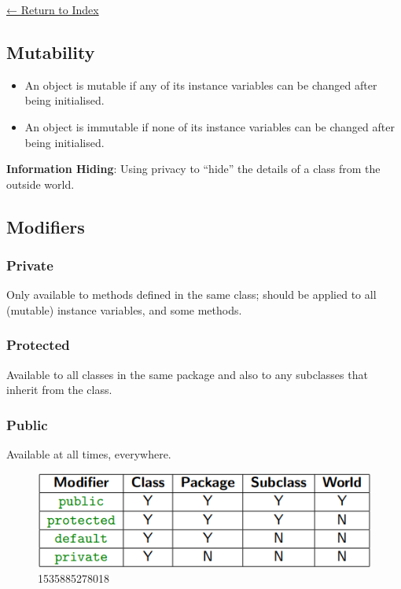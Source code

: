 \documentclass[]{article}
\providecommand{\tightlist}{%
  \setlength{\itemsep}{0pt}\setlength{\parskip}{0pt}}
\begin{document}
\protect\hyperlink{table-of-contents}{← Return to Index}

\hypertarget{mutability}{%
\subsection{Mutability}\label{mutability}}

\begin{itemize}
\tightlist
\item
  An object is mutable if any of its instance variables can be changed
  after being initialised.
\item
  An object is immutable if none of its instance variables can be
  changed after being initialised.
\end{itemize}

\textbf{Information Hiding}: Using privacy to ``hide'' the details of a
class from the outside world.

\hypertarget{modifiers}{%
\subsection{Modifiers}\label{modifiers}}

\hypertarget{private}{%
\subsubsection{Private}\label{private}}

Only available to methods defined in the same class; should be applied
to all (mutable) instance variables, and some methods.

\hypertarget{protected}{%
\subsubsection{Protected}\label{protected}}

Available to all classes in the same package and also to any subclasses
that inherit from the class.

\hypertarget{public}{%
\subsubsection{Public}\label{public}}

Available at all times, everywhere.

\begin{figure}
\centering
\includegraphics{images/privacymodifiers.png}
\caption{1535885278018}
\end{figure}
\end{document}
